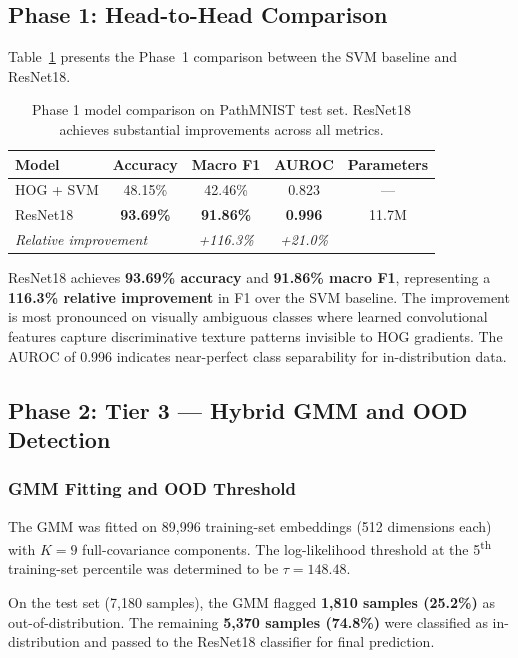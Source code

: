 \documentclass{article}
\begin{document}
\subsection{Phase 1: Head-to-Head Comparison}

Table~\ref{tab:phase1_comparison} presents the Phase~1 comparison between the SVM baseline and ResNet18.

\begin{table}[h]
\centering
\caption{Phase 1 model comparison on PathMNIST test set. ResNet18 achieves substantial improvements across all metrics.}
\label{tab:phase1_comparison}
\begin{tabular}{lcccc}
\toprule
\textbf{Model} & \textbf{Accuracy} & \textbf{Macro F1} & \textbf{AUROC} & \textbf{Parameters} \\
\midrule
HOG + SVM & 48.15\% & 42.46\% & 0.823 & --- \\
ResNet18  & \textbf{93.69\%} & \textbf{91.86\%} & \textbf{0.996} & 11.7M \\
\midrule
\multicolumn{2}{l}{\textit{Relative improvement}} & \textit{+116.3\%} & \textit{+21.0\%} & \\
\bottomrule
\end{tabular}
\end{table}

ResNet18 achieves \textbf{93.69\% accuracy} and \textbf{91.86\% macro F1}, representing a \textbf{116.3\% relative improvement} in F1 over the SVM baseline. The improvement is most pronounced on visually ambiguous classes where learned convolutional features capture discriminative texture patterns invisible to HOG gradients. The AUROC of 0.996 indicates near-perfect class separability for in-distribution data.

\subsection{Phase 2: Tier 3 --- Hybrid GMM and OOD Detection}

\subsubsection{GMM Fitting and OOD Threshold}

The GMM was fitted on 89,996 training-set embeddings (512 dimensions each) with $K = 9$ full-covariance components. The log-likelihood threshold at the 5\textsuperscript{th} training-set percentile was determined to be $\tau = 148.48$.

On the test set (7,180 samples), the GMM flagged \textbf{1,810 samples (25.2\%)} as out-of-distribution. The remaining \textbf{5,370 samples (74.8\%)} were classified as in-distribution and passed to the ResNet18 classifier for final prediction.
\end{document}
